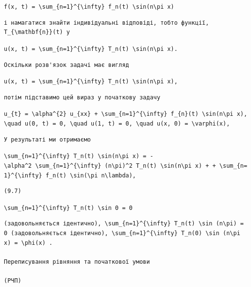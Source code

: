 \documentclass[
  ukrainian,
]{article}
\begin{document}
\texttt{f(x,\ t)\ =\ \textbackslash{}sum\_\{n=1\}\^{}\{\textbackslash{}infty\}\ f\_n(t)\ \textbackslash{}sin(n\textbackslash{}pi\ x)}

\begin{verbatim}
і намагатися знайти індивідуальні відповіді, тобто функції, T_{\mathbf{n}}(t) у
\end{verbatim}

\texttt{u(x,\ t)\ =\ \textbackslash{}sum\_\{n=1\}\^{}\{\textbackslash{}infty\}\ T\_n(t)\ \textbackslash{}sin(n\textbackslash{}pi\ x).}

\begin{verbatim}
Оскільки розв'язок задачі має вигляд
\end{verbatim}

\texttt{u(x,\ t)\ =\ \textbackslash{}sum\_\{n=1\}\^{}\{\textbackslash{}infty\}\ T\_n(t)\ \textbackslash{}sin(n\textbackslash{}pi\ x),}

\begin{verbatim}
потім підставимо цей вираз у початкову задачу
\end{verbatim}

\texttt{u\_\{t\}\ =\ \textbackslash{}alpha\^{}\{2\}\ u\_\{xx\}\ +\ \textbackslash{}sum\_\{n=1\}\^{}\{\textbackslash{}infty\}\ f\_\{n\}(t)\ \textbackslash{}sin(n\textbackslash{}pi\ x),}
\texttt{\textbackslash{}quad\ u(0,\ t)\ =\ 0,\ \textbackslash{}quad\ u(1,\ t)\ =\ 0,\ \textbackslash{}quad\ u(x,\ 0)\ =\ \textbackslash{}varphi(x),}

\begin{verbatim}
У результаті ми отримаємо
\end{verbatim}

\texttt{\textbackslash{}sum\_\{n=1\}\^{}\{\textbackslash{}infty\}\ T\textquotesingle{}\_n(t)\ \textbackslash{}sin(n\textbackslash{}pi\ x)\ =\ -\textbackslash{}alpha\^{}2\ \textbackslash{}sum\_\{n=1\}\^{}\{\textbackslash{}infty\}\ (n\textbackslash{}pi)\^{}2\ T\_n(t)\ \textbackslash{}sin(n\textbackslash{}pi\ x)\ +\ +\ \textbackslash{}sum\_\{n=1\}\^{}\{\textbackslash{}infty\}\ f\_n(t)\ \textbackslash{}sin(\textbackslash{}pi\ n\textbackslash{}lambda),}

\begin{verbatim}
(9.7)
\end{verbatim}

\texttt{\textbackslash{}sum\_\{n=1\}\^{}\{\textbackslash{}infty\}\ T\_n(t)\ \textbackslash{}sin\ 0\ =\ 0}

\begin{verbatim}
(задовольняється ідентично), \sum_{n=1}^{\infty} T_n(t) \sin (n\pi) = 0 (задовольняється ідентично), \sum_{n=1}^{\infty} T_n(0) \sin (n\pi x) = \phi(x) .

Переписування рівняння та початкової умови

(РЧП)
\end{verbatim}
\end{document}
